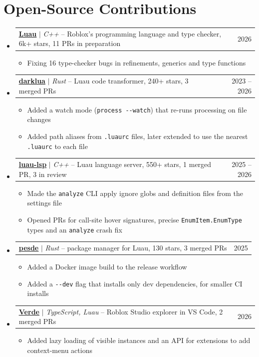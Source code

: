 \documentclass[a4paper,11pt]{article}
\makeatletter
\newcommand{\resumeItem}[1]{
  \item\small{
    {#1\vspace{-2pt}}%
  }%
}
\newcommand{\resumeProjectHeading}[2]{
    \item
    \begin{tabular*}{0.97\textwidth}{l@{\extracolsep{\fill}}r}
      \small#1 & #2 \\
    \end{tabular*}\vspace{-7pt}
}
\newcommand{\resumeSubHeadingListStart}{\begin{itemize}[leftmargin=0.15in, label={}]}
\newcommand{\resumeSubHeadingListEnd}{\end{itemize}}
\newcommand{\resumeItemListStart}{\begin{itemize}}
\newcommand{\resumeItemListEnd}{\end{itemize}\vspace{-5pt}}
\makeatother
\begin{document}
\section{Open-Source Contributions}
  \resumeSubHeadingListStart
    \resumeProjectHeading
      {\textbf{\href{https://github.com/luau-lang/luau/issues?q=author:Stefanuk12}{\underline{Luau}}} $|$ \emph{C++} -- Roblox's programming language and type checker, 6k+ stars, 11 PRs in preparation}{2026}
      \resumeItemListStart
        \resumeItem{Fixing 16 type-checker bugs in refinements, generics and type functions}
      \resumeItemListEnd
    \resumeProjectHeading
      {\textbf{\href{https://github.com/seaofvoices/darklua/issues?q=author:Stefanuk12}{\underline{darklua}}} $|$ \emph{Rust} -- Luau code transformer, 240+ stars, 3 merged PRs}{2023 -- 2026}
      \resumeItemListStart
        \resumeItem{Added a watch mode (\texttt{process -{}-watch}) that re-runs processing on file changes}
        \resumeItem{Added path aliases from \texttt{.luaurc} files, later extended to use the nearest \texttt{.luaurc} to each file}
      \resumeItemListEnd
    \resumeProjectHeading
      {\textbf{\href{https://github.com/JohnnyMorganz/luau-lsp/issues?q=author:Stefanuk12}{\underline{luau-lsp}}} $|$ \emph{C++} -- Luau language server, 550+ stars, 1 merged PR, 3 in review}{2025 -- 2026}
      \resumeItemListStart
        \resumeItem{Made the \texttt{analyze} CLI apply ignore globs and definition files from the settings file}
        \resumeItem{Opened PRs for call-site hover signatures, precise \texttt{EnumItem.EnumType} types and an \texttt{analyze} crash fix}
      \resumeItemListEnd
    \resumeProjectHeading
      {\textbf{\href{https://github.com/pesde-pkg/pesde/issues?q=author:Stefanuk12}{\underline{pesde}}} $|$ \emph{Rust} -- package manager for Luau, 130 stars, 3 merged PRs}{2025}
      \resumeItemListStart
        \resumeItem{Added a Docker image build to the release workflow}
        \resumeItem{Added a \texttt{-{}-dev} flag that installs only dev dependencies, for smaller CI installs}
      \resumeItemListEnd
    \resumeProjectHeading
      {\textbf{\href{https://github.com/Dvitash/Verde/issues?q=author:Stefanuk12}{\underline{Verde}}} $|$ \emph{TypeScript, Luau} -- Roblox Studio explorer in VS Code, 2 merged PRs}{2026}
      \resumeItemListStart
        \resumeItem{Added lazy loading of visible instances and an API for extensions to add context-menu actions}
      \resumeItemListEnd
  \resumeSubHeadingListEnd


\end{document}

